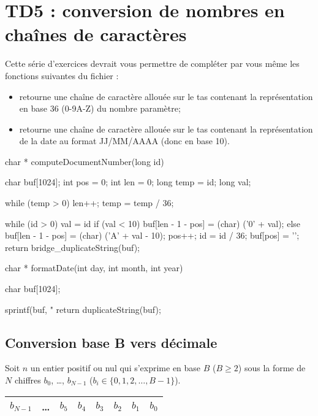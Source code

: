 \chapter{TD5 : conversion de nombres en chaînes de caractères}

Cette série d'exercices devrait vous permettre de compléter par vous même les fonctions suivantes du fichier  :
\begin{itemize}
  \item {} retourne une chaîne de caractère allouée sur le tas contenant la représentation en base 36 (0-9A-Z) du nombre paramètre;
  \item {} retourne une chaîne de caractère allouée sur le tas contenant la représentation de la date au format JJ/MM/AAAA (donc en base 10).
\end{itemize}

\begin{csourcecorrection}
char * computeDocumentNumber(long id) {
    char buf[1024];
    int pos = 0;
    int len = 0;
    long temp = id;
    long val;

    while (temp > 0) {
        len++;
        temp = temp / 36;
    }

    while (id > 0) {
        val = id %
        if (val < 10)
            buf[len - 1 - pos] = (char) ('0' + val);
        else
            buf[len - 1 - pos] = (char) ('A' + val - 10);
        pos++;
        id = id / 36;
    }
    buf[pos] = '\0';
    return bridge_duplicateString(buf);
}
char * formatDate(int day, int month, int year) {
    char buf[1024];

    sprintf(buf, "%
    return duplicateString(buf);
}
\end{csourcecorrection}


\section{Conversion base B vers décimale}

Soit $n$ un entier positif ou nul qui s'exprime en base $B$ ($B\geq2$) sous la forme de $N$ chiffres $b_0$, \ldots, $b_{N-1}$ ($b_i\in\{0,1,2,\ldots,B-1\}$).

\begin{center}
\begin{tabular}{|c|c|c|c|c|c|c|c|}
\hline
$b_{N-1}$&\ldots&$b_5$&$b_4$&$b_3$&$b_2$&$b_1$&$b_0$\\
\hline
\end{tabular}
\end{center}

